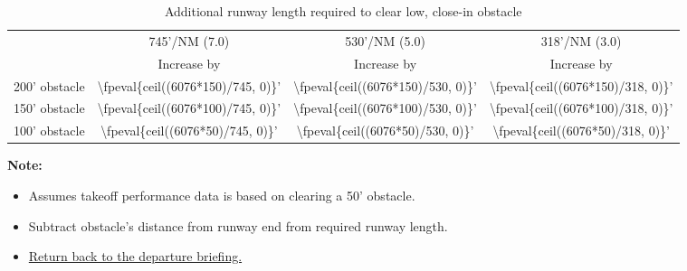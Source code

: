 \begin{table}[ht]
    \hypertarget{runway-length-table}{\caption{Additional runway length required to clear low, close-in obstacle}}

    \begin{center}
        \begin{tabular}{lccc}
            \toprule
                          & \multicolumn{1}{c}{745'/NM (7.0\textdegree{})} & \multicolumn{1}{c}{530'/NM (5.0\textdegree{})} & \multicolumn{1}{c}{318'/NM (3.0\textdegree{})}
            \\\cmidrule(lr){2-2}\cmidrule(lr){3-3}\cmidrule(lr){4-4}
                          & Increase by                                    & Increase by                                    & Increase by                                    \\\midrule
            200' obstacle & \num{\fpeval{ceil((6076*150)/745, 0)}}'        & \num{\fpeval{ceil((6076*150)/530, 0)}}'        & \num{\fpeval{ceil((6076*150)/318, 0)}}'        \\
            150' obstacle & \num{\fpeval{ceil((6076*100)/745, 0)}}'        & \num{\fpeval{ceil((6076*100)/530, 0)}}'        & \num{\fpeval{ceil((6076*100)/318, 0)}}'        \\
            100' obstacle & \num{\fpeval{ceil((6076*50)/745, 0)}}'         & \num{\fpeval{ceil((6076*50)/530, 0)}}'         & \num{\fpeval{ceil((6076*50)/318, 0)}}'         \\
        \end{tabular}
    \end{center}

    \textbf{Note:}
    \begin{itemize}
        \item Assumes takeoff performance data is based on clearing a 50' obstacle.
        \item Subtract obstacle's distance from runway end from required runway length.
        \item \hyperlink{departure-briefing}{Return back to the departure briefing.}
    \end{itemize}
\end{table}

{}

